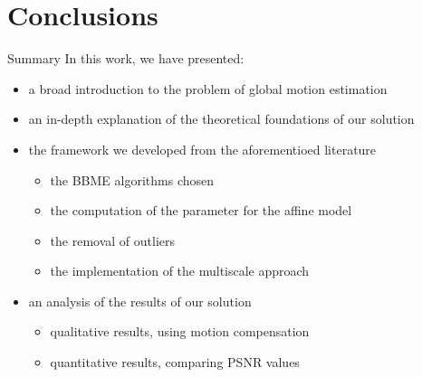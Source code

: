 \documentclass[aspectratio=1610,xcolor=dvipsnames]{beamer}
\begin{document}
\section{Conclusions}
\begin{frame}
    \begin{block}{Summary}
        In this work, we have presented:
        \begin{itemize}
            \item a broad introduction to the problem of global motion estimation
            \item an in-depth explanation of the theoretical foundations of our solution
            \item the framework we developed from the aforementioed literature
            \begin{itemize}
                \item the BBME algorithms chosen
                \item the computation of the parameter for the affine model
                \item the removal of outliers
                \item the implementation of the multiscale approach
            \end{itemize}
            \item an analysis of the results of our solution
            \begin{itemize}
                \item qualitative results, using motion compensation
                \item quantitative results, comparing PSNR values
            \end{itemize} 
        \end{itemize}        
    \end{block}
\end{frame}
\end{document}
